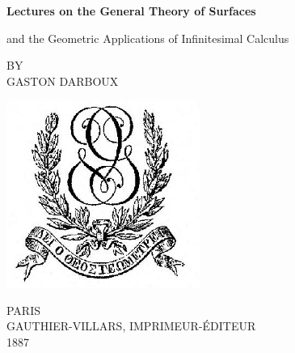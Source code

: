 \clearpage
\newcommand\nbvspace[1][3]{\vspace*{\stretch{#1}}}
\newcommand\nbstretchyspace{\spaceskip0.5em plus 0.25em minus 0.25em}
\newcommand{\nbtitlestretch}{\spaceskip0.6em}
\pagestyle{empty}
\begin{center}
\bfseries
\nbvspace[1]
\Huge
{\huge
Lectures on the General Theory of Surfaces}

\normalsize

and the Geometric Applications of Infinitesimal Calculus

\nbvspace[1]
\small BY\\
\Large GASTON DARBOUX\\[0.5em]

\nbvspace[2]

\includegraphics[width=2.5in]{./title/Logo_Gauthier-Villars.png}
\nbvspace[3]
\normalsize

PARIS\\
\large
GAUTHIER-VILLARS, IMPRIMEUR-\'EDITEUR \\
1887
\nbvspace[1]
\end{center}